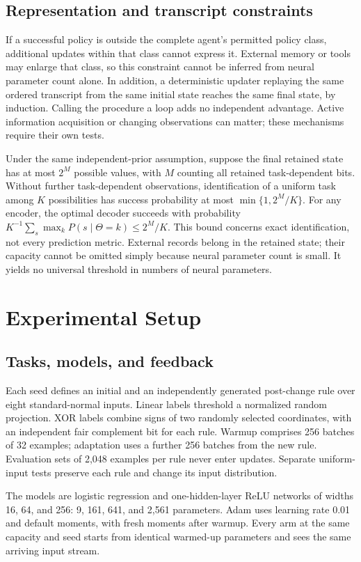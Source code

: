 \documentclass[11pt]{article}
\begin{document}
\subsection{Representation and transcript constraints}
If a successful policy is outside the complete agent's permitted policy class,
additional updates within that class cannot express it. External memory or
tools may enlarge that class, so this constraint cannot be inferred from
neural parameter count alone. In addition, a deterministic updater replaying
the same ordered transcript from the same initial state reaches the same
final state, by induction. Calling the procedure a loop adds no independent
advantage. Active information acquisition or changing observations can matter;
these mechanisms require their own tests.

Under the same independent-prior assumption, suppose the final retained state has at
most $2^M$ possible values, with $M$ counting all retained task-dependent bits.
Without further task-dependent observations, identification of a uniform task
among $K$ possibilities has success probability at most
$\min\{1,2^M/K\}$. For any encoder, the optimal decoder succeeds with probability
$K^{-1}\sum_s\max_k P(s\mid\Theta=k)\leq 2^M/K$.
This bound concerns exact identification, not every prediction metric. External
records belong in the retained state; their capacity cannot be omitted simply
because neural parameter count is small. It yields no universal threshold in
numbers of neural parameters.

\section{Experimental Setup}
\subsection{Tasks, models, and feedback}
Each seed defines an initial and an independently generated post-change rule
over eight standard-normal inputs. Linear labels threshold a normalized random
projection. XOR labels combine signs of two randomly selected coordinates,
with an independent fair complement bit for each rule. Warmup comprises 256
batches of 32 examples; adaptation uses a further 256 batches from the new
rule. Evaluation sets of 2,048 examples per rule never enter updates. Separate
uniform-input tests preserve each rule and change its input distribution.

The models are logistic regression and one-hidden-layer ReLU networks of
widths 16, 64, and 256: 9, 161, 641, and 2,561 parameters. Adam uses learning
rate 0.01 and default moments, with fresh moments after warmup. Every arm at
the same capacity and seed starts from identical warmed-up parameters and
sees the same arriving input stream.
\end{document}
